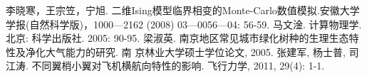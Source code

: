 \documentclass[a4paper,11pt,onecolumn,twoside]{article}
\begin{document}
\small
\begin{thebibliography}{99}
\setlength{\parskip}{0pt}
 李晓寒，王宗笠，宁旭. 二维Ising模型临界相变的Monte-Carlo数值模拟.安徽大学学报(自然科学版)，1000—2162 (2008) 03—0056—04: 56-59.
 马文淦. 计算物理学. 北京: 科学出版社. 2005: 90-95.
 梁淑英. 南京地区常见城市绿化树种的生理生态特性及净化大气能力的研究. 南
京林业大学硕士学位论文, 2005.
 张建军, 杨士普, 司江涛. 不同翼梢小翼对飞机横航向特性的影响. 飞行力学, 2011,
29(4): 1-1. %
\end{thebibliography}
\normalsize
\newpage
\end{document}
